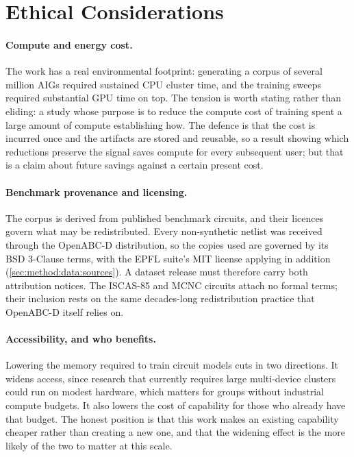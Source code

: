 \section{Ethical Considerations}
\label{sec:discussion:ethics}
\paragraph{Compute and energy cost.}
The work has a real environmental footprint: generating a corpus of several million AIGs
required sustained CPU cluster time, and the training sweeps required substantial GPU time
on top. The tension is worth stating rather than eliding: a study whose purpose is to
reduce the compute cost of training spent a large amount of compute establishing how. The
defence is that the cost is incurred once and the artifacts are stored and reusable, so a
result showing which reductions preserve the signal saves compute for every subsequent user;
but that is a claim about future savings against a certain present cost.

\paragraph{Benchmark provenance and licensing.}
The corpus is derived from published benchmark circuits, and their licences govern what may
be redistributed. Every non-synthetic netlist was received through the OpenABC-D
distribution, so the copies used are governed by its BSD 3-Clause terms, with the EPFL
suite's MIT license applying in addition (\ref{sec:method:data:sources}). A dataset release
must therefore carry both attribution notices. The ISCAS-85 and MCNC circuits attach no
formal terms; their inclusion rests on the same decades-long redistribution practice that
OpenABC-D itself relies on.

\paragraph{Accessibility, and who benefits.}
Lowering the memory required to train circuit models cuts in two directions. It widens
access, since research that currently requires large multi-device clusters could run on modest
hardware, which matters for groups without industrial compute budgets. It also lowers the
cost of capability for those who already have that budget. The honest position is that this
work makes an existing capability cheaper rather than creating a new one, and that the
widening effect is the more likely of the two to matter at this scale.

